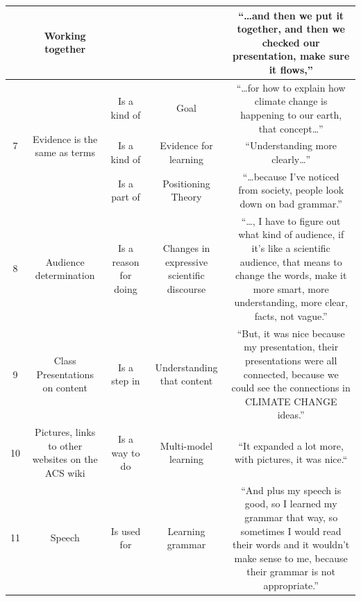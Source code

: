 \documentclass[11.5pt]{sig-alternate} %
\begin{document}
\begin{table}[!htbp]
\begin{tabular}{|c|c|c|c|c|}
& Working together & & & “…and then we put it together, and then we checked our presentation, make sure it flows,” \\ \hline
\multirow{3}{*}{7} & \multirow{3}{*}{Evidence is the same as terms} & Is a kind of & Goal & “…for how to explain how climate change is happening to our earth, that concept…” \\ \cline{3-5}
& & Is a kind of & Evidence for learning &  “Understanding more clearly…” \\ \cline{3-5}
& & Is a part of & Positioning Theory & “…because I’ve noticed from society, people look down on bad grammar.” \\ \hline
8 & Audience determination & Is a reason for doing & Changes in expressive scientific discourse & “…, I have to figure out what kind of audience, if it’s like a scientific audience, that means to change the words, make it more smart, more understanding, more clear, facts, not vague.” \\ \hline
9 & Class Presentations on content & Is a step in & Understanding that content & “But, it was nice because my presentation, their presentations were all connected, because we could see the connections in CLIMATE CHANGE ideas.” \\ \hline
10 & Pictures, links to other websites on the ACS wiki & Is a way to do & Multi-model learning & “It expanded a lot more, with pictures, it was nice.“ \\ \hline
11 & Speech & Is used for & Learning grammar & ``And plus my speech is good, so I learned my grammar that way, so sometimes I would read their words and it wouldn’t make sense to me, because their grammar is not appropriate.'' \\ \hline
\end{tabular}
\end{table}
\end{document}
